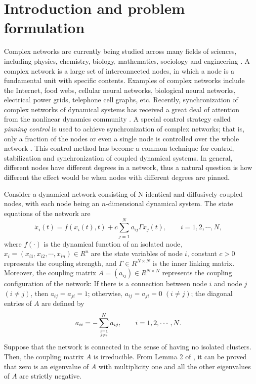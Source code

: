 \documentclass[11pt]{article}
\begin{document}
\section{Introduction and problem formulation}
\quad Complex networks are currently being studied across many
fields of sciences, including physics, chemistry, biology,
mathematics, sociology and engineering
\cite{r2,r12,r3,r5,r4,r11,r6,r1}. A complex network is a large set
of interconnected nodes, in which a node is a fundamental unit with
specific contents. Examples of complex networks include the
Internet, food webs, cellular neural networks, biological neural
networks, electrical power grids, telephone cell graphs, etc.
Recently, synchronization of complex networks of dynamical systems
has received a great deal of attention from the nonlinear dynamics
community \cite{jia54,r7,jia51,jia52,jia56}. A special control
strategy called \textit{pinning control} is used to achieve
synchronization of complex networks; that is, only a fraction of the
nodes or even a single node is controlled over the whole network
\cite{jia53,r8,jia55,jia57}. This control method has become a common
technique for control, stabilization and synchronization of coupled
dynamical systems. In general, different nodes have different
degrees in a network, thus a natural question is how different the
effect would be when nodes with different degrees are pinned.

Consider a dynamical network consisting of N identical and
diffusively coupled nodes, with each node being an $n$-dimensional
dynamical system. The state equations of the network are
\begin{equation} \label{syn1}
\dot{x}_i(t)=f(x_i(t),t)+c\sum ^{N}_{j=1}a_{ij}\Gamma x_j(t),\qquad
i=1,2,\cdots,N,
\end{equation}
where $f(\cdot)$ is the dynamical function of an isolated node,
$x_i=(x_{i1},x_{i2},\cdots,x_{in})\in R^{n}$ are the state variables
of node $i$, constant $c>0$ represents the coupling strength, and
$\Gamma\in R^{N\times N}$ is the inner linking matrix. Moreover, the
coupling matrix $A=(a_{ij})\in R^{N\times N}$ represents the
coupling configuration of the network: If there is a connection
between node $i$ and node $j$ $(i\neq j)$, then $a_{ij}=a_{ji}=1$;
otherwise, $a_{ij}=a_{ji}=0$ $(i\neq j)$; the diagonal entries of
$A$ are defined by
\begin{equation} \label{syn2}
a_{ii}=-\sum ^{N}_{j=1 \atop j\neq i}a_{ij},\qquad i=1,2,\cdots,N.
\end{equation}
Suppose that the network is connected in the sense of having no
isolated clusters. Then, the coupling matrix $A$ is irreducible.
From Lemma 2 of \cite{jia56}, it can be proved that zero is an
eigenvalue of $A$ with multiplicity one and all the other
eigenvalues of $A$ are strictly negative.
\end{document}
